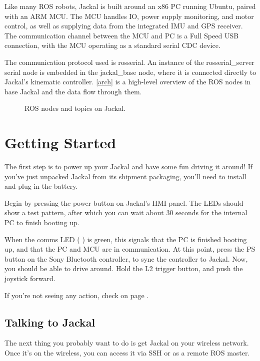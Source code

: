 \documentclass[]{clearpath-manual}
\begin{document}
Like many ROS robots, Jackal is built around an x86 PC running Ubuntu, paired with an
ARM MCU. The MCU handles IO, power supply monitoring, and motor control, as well as
supplying data from the integrated IMU and GPS receiver. The communication channel
between the MCU and PC is a Full Speed USB connection, with the MCU operating as a
standard serial CDC device.

The communication protocol used is rosserial. An instance of the rosserial\_server
serial node is embedded in the jackal\_base node, where it is connected directly to
Jackal's kinematic controller. \autoref{arch} is a high-level overview of the ROS
nodes in base Jackal and the data flow through them.

\begin{figure}[hb]
  \centering
  \placeholder{16cm}{18cm}
  \caption{ROS nodes and topics on Jackal.}
  \label{arch}
\end{figure}

\section{Getting Started}

The first step is to power up your Jackal and have some fun driving it around! If you've
just unpacked Jackal from its shipment packaging, you'll need to install and plug in the
battery.

Begin by pressing the power button on Jackal's HMI panel. The LEDs should show a test
pattern, after which you can wait about 30 seconds for the internal PC to finish booting
up.

When the comms LED ( \placeholder{0.35cm}{0.35cm} ) is green, this signals that the PC is
finished booting up, and that the PC and MCU are in communication. At this point, press
the PS button on the Sony Bluetooth controller, to sync the controller to Jackal. Now,
you should be able to drive around. Hold the L2 trigger button, and push the joystick
forward.

If you're not seeing any action, check  on page \pageref{trouble}.

\subsection{Talking to Jackal}

The next thing you probably want to do is get Jackal on your wireless network. Once it's
on the wireless, you can access it via SSH or as a remote ROS master.
\end{document}
